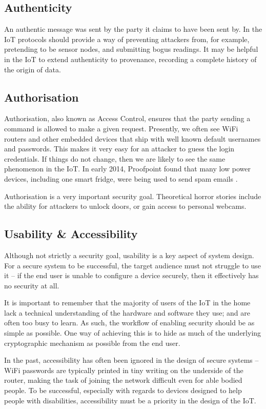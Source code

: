 \documentclass[10pt,journal,compsoc]{IEEEtran}
\begin{document}
\subsection{Authenticity}
An authentic message was sent by the party it claims to have been sent by. In
the IoT protocols should provide a way of preventing attackers from, for
example, pretending to be sensor nodes, and submitting bogus readings. It may
be helpful in the IoT to extend authenticity to provenance, recording a
complete history of the origin of data.  

\subsection{Authorisation}
Authorisation, also known as Access Control, ensures that the party sending a
command is allowed to make a given request. Presently, we often see WiFi
routers and other embedded devices that ship with well known default usernames
and passwords. This makes it very easy for an attacker to guess the login
credentials. If things do not change, then we are likely to see the same
phenomenon in the IoT. In early 2014, Proofpoint found that many low power
devices, including one smart fridge, were being used to send spam emails
\cite{Proofpoint2014}.

Authorisation is a very important security goal. Theoretical horror stories
include the ability for attackers to unlock doors, or gain access to personal
webcams.  

\subsection{Usability \& Accessibility}
Although not strictly a security goal, usability is a key aspect of system
design. For a secure system to be successful, the target audience must not
struggle to use it -- if the end user is unable to configure a device securely,
then it effectively has no security at all.

It is important to remember that the majority of users of the IoT in the home
lack a technical understanding of the hardware and software they use; and are
often too busy to learn. As such, the workflow of enabling security should be
as simple as possible. One way of achieving this is to hide as much of the
underlying cryptographic mechanism as possible from the end user.

In the past, accessibility has often been ignored in the design of secure
systems -- WiFi passwords are typically printed in tiny writing on the
underside of the router, making the task of joining the network difficult even
for able bodied people. To be successful, especially with regards to devices
designed to help people with disabilities, accessibility must be a priority in
the design of the IoT.  
\end{document}
